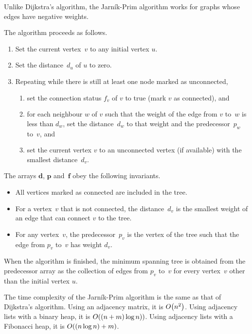 Unlike Dijkstra's algorithm, the Jarn\'{i}k-Prim algorithm works for graphs whose edges have negative weights.

The algorithm proceeds as follows.
\begin{enumerate}
  \item Set the current vertex~\( v \) to any initial vertex \( u \).
  \item Set the distance~\( d_{u} \) of \( u \) to zero.
  \item Repeating while there is still at least one node marked as unconnected,
  \begin{enumerate}
    \item set the connection status \( f_{v} \) of \( v \) to true (mark \( v \) as connected), and
    \item for each neighbour \( w \) of \( v \) such that the weight of the edge from \( v \) to~\( w \) is less than \( d_{w} \), set the distance~\( d_{w} \) to that weight and the predecessor~\( p_{w} \) to~\( v \), and
    \item set the current vertex \( v \) to an unconnected vertex (if available) with the smallest distance~\( d_{v} \).
  \end{enumerate}
\end{enumerate}

The arrays \( \boldsymbol{d} \), \( \boldsymbol{p} \) and~\( \boldsymbol{f} \) obey the following invariants.
\begin{itemize}
  \item All vertices marked as connected are included in the tree.
  \item For a vertex~\( v \) that is not connected, the distance~\( d_{v} \) is the smallest weight of an edge that can connect \( v \) to the tree.
  \item For any vertex~\( v \), the predecessor~\( p_{v} \) is the vertex of the tree such that the edge from \( p_{v} \) to~\( v \) has weight \( d_{v} \).
\end{itemize}
When the algorithm is finished, the minimum spanning tree is obtained from the predecessor array as the collection of edges from \( p_{v} \) to~\( v \) for every vertex~\( v \) other than the initial vertex \( u \).

The time complexity of the Jarn\'{i}k-Prim algorithm is the same as that of Dijkstra's algorithm.
Using an adjacency matrix, it is \( O\!\left(n^{2}\right) \).
Using adjacency lists with a binary heap, it is \( O\!\left(\left( n + m \right) \log n)\right) \).
Using adjacency lists with a Fibonacci heap, it is \( O\!\left(\left( n \log n \right) + m\right) \).
